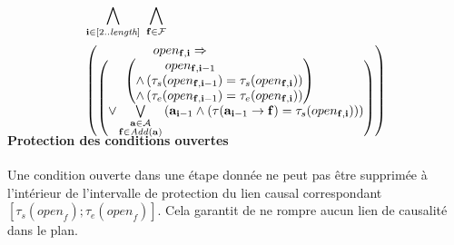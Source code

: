 \begin{small}
\begin{multline*}
~\\[-3em]
\bigwedge\limits_{\substack{\mathbf{i}\in [2..\mathbf{\length}]}}~\bigwedge\limits_{\substack{\mathbf{\f}\in \mathbf{\F}}}\hfill\\
\begin{pmatrix}open_{\mathbf{\f},\mathbf{i}} \Rightarrow\hfill\\ \begin{pmatrix}\begin{pmatrix}open_{\mathbf{\f},\mathbf{i} - 1}\hfill\\ \wedge %
\left(\tau_{s}(open_{\mathbf{\f},\mathbf{i} - 1}) = \tau_{s}(open_{\mathbf{\f},\mathbf{i}})\right)\hfill\\
 \wedge \left(\tau_{e}(open_{\mathbf{f},\mathbf{i} - 1}) = \tau_{e}(open_{\mathbf{\f},\mathbf{i}})
 \right)\end{pmatrix}\hfill\\
 \vee \bigvee\limits_{\substack{\mathbf{\a}\in \mathbf{\A}\\\mathbf{\f} \in \add{\mathbf{\a}}}}\left(\mathbf{\a}_{\mathbf{i} - 1} \wedge \left(\tau(\mathbf{\a}_{\mathbf{i} - 1}\rightarrow \mathbf{\f}) = \tau_{s}(open_{\mathbf{\f},\mathbf{i}})\right)\right)\hfill\\
 \end{pmatrix}\end{pmatrix}\\[-2em]
\end{multline*}
\end{small}


\paragraph*{Protection des conditions ouvertes}

Une condition ouverte dans une \'{e}tape donn\'{e}e ne peut pas \^{e}tre supprim\'{e}e \`{a} l'int\'{e}rieur de l'intervalle de protection du lien causal correspondant $[\tau_{s}(\textit{open}_{f});\tau_{e}(\textit{open}_{f})]$. Cela garantit de ne rompre aucun lien de causalit\'{e} dans le plan.

